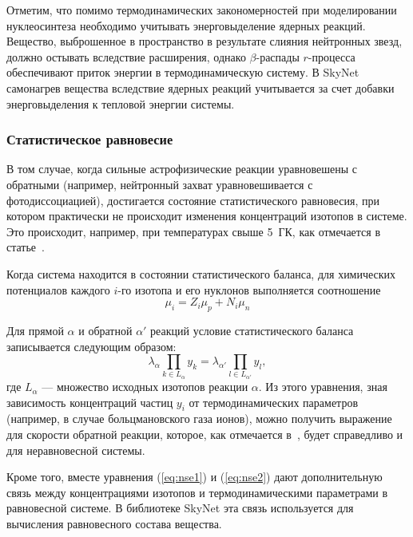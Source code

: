 Отметим, что помимо термодинамических закономерностей при моделировании нуклеосинтеза необходимо учитывать энерговыделение ядерных реакций. Вещество, выброшенное в пространство в результате слияния нейтронных звезд, должно остывать вследствие расширения, однако $\beta$-распады $r$-процесса обеспечивают приток энергии в термодинамическую систему. В SkyNet самонагрев вещества вследствие ядерных реакций учитывается за счет добавки энерговыделения к тепловой энергии системы.

\subsubsection{Статистическое равновесие}
\label{sec:nse}
В том случае, когда сильные астрофизические реакции уравновешены с обратными (например, нейтронный захват уравновешивается с фотодиссоциацией), достигается состояние статистического равновесия, при котором практически не происходит изменения концентраций изотопов в системе. Это происходит, например, при температурах свыше 5~ГК, как отмечается в статье~\cite{lippuner2017}.  

Когда система находится в состоянии статистического баланса, для химических потенциалов каждого $i$-го изотопа и его нуклонов выполняется соотношение
\begin{equation}
  \mu_i = Z_i \mu_p + N_i \mu_n
  \label{eq:nse1}
\end{equation}

Для прямой $\alpha$ и обратной $\alpha'$ реакций условие статистического баланса записывается следующим образом:
\begin{equation}
\lambda_\alpha \prod_{k \in L_\alpha} y_k = \lambda_{\alpha'} \prod_{l \in L_{\alpha'}} y_l,
\label{eq:nse2}
\end{equation}
где $L_\alpha$ --- множество исходных изотопов реакции $\alpha$. Из этого уравнения, зная зависимость концентраций частиц $y_i$ от термодинамических параметров (например, в случае больцмановского газа ионов), можно получить выражение для скорости обратной реакции, которое, как отмечается в~\cite{lippuner2017}, будет справедливо и для неравновесной системы. 

Кроме того, вместе уравнения (\ref{eq:nse1}) и (\ref{eq:nse2}) дают дополнительную связь между концентрациями изотопов и термодинамическими параметрами в равновесной системе. В библиотеке SkyNet эта связь используется для вычисления равновесного состава вещества.
